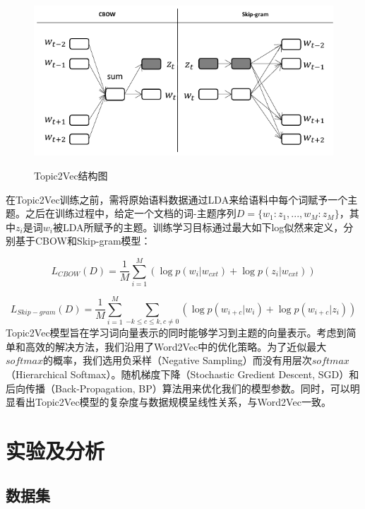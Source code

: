\documentclass[master]{njuthesis}
\begin{document}
\begin{figure}[htbp]
  \centering
  \includegraphics[width= 1.0\textwidth]{figures//topic2vec_chap3.pdf}\\
  \caption{Topic2Vec结构图}\label{fig:topic2vec}
\end{figure}

在Topic2Vec训练之前，需将原始语料数据通过LDA来给语料中每个词赋予一个主题。之后在训练过程中，给定一个文档的词-主题序列$D=\{w_1:z_1, ..., w_M:z_M\}$，其中$z_i$是词$w_i$被LDA所赋予的主题。训练学习目标通过最大如下log似然来定义，分别基于CBOW和Skip-gram模型：

	\begin{equation}
	{L}_{CBOW}(D)=\frac{1}{M}\sum_{i=1}^{M}(\log p(w_{i}|w_{cxt})+\log p(z_{i}|w_{cxt}))
	\end{equation}
	
	\begin{equation}
	{L}_{Skip-gram}(D)=\frac{1}{M}\sum_{i=1}^{M}\sum_{-k\leq c\leq k,c\neq 0}(\log p(w_{i+c}|w_{i})+\log p(w_{i+c}|z_{i}))
	\end{equation}
Topic2Vec模型旨在学习词向量表示的同时能够学习到主题的向量表示。考虑到简单和高效的解决方法，我们沿用了Word2Vec中的优化策略。为了近似最大$softmax$的概率，我们选用负采样（Negative Sampling）而没有用层次$softmax$（Hierarchical Softmax）。随机梯度下降（Stochastic Gredient Descent, SGD）和后向传播（Back-Propagation, BP）算法用来优化我们的模型参数。同时，可以明显看出Topic2Vec模型的复杂度与数据规模呈线性关系，与Word2Vec一致。


\section{实验及分析}\label{sec_chap3}

\subsection{数据集}
\end{document}
